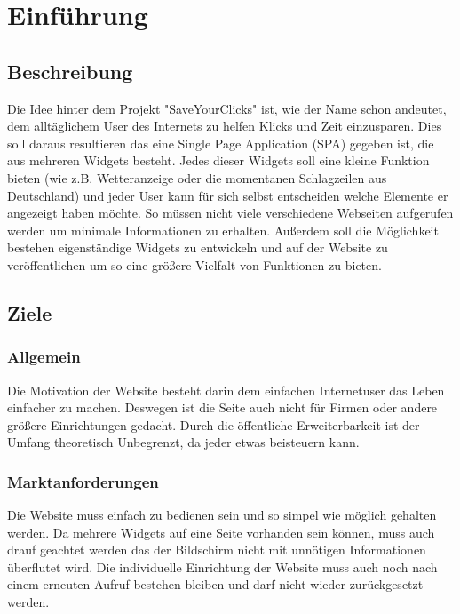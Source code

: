 \newpage

\section{Einführung}

	\subsection{Beschreibung}
		Die Idee hinter dem Projekt "SaveYourClicks" ist, wie der Name schon andeutet, dem alltäglichem User des Internets zu helfen Klicks und Zeit einzusparen. Dies soll daraus resultieren das eine Single Page Application (SPA) gegeben ist, die aus mehreren Widgets besteht. Jedes dieser Widgets soll eine kleine Funktion bieten (wie z.B. Wetteranzeige oder die momentanen Schlagzeilen aus Deutschland) und jeder User kann für sich selbst entscheiden welche Elemente er angezeigt haben möchte. So müssen nicht viele verschiedene Webseiten aufgerufen werden um minimale Informationen zu erhalten. 
		Außerdem soll die Möglichkeit bestehen eigenständige Widgets zu entwickeln und auf der Website zu veröffentlichen um so eine größere Vielfalt von Funktionen zu bieten.
	
	\subsection{Ziele}
	
		\subsubsection{Allgemein}
			Die Motivation der Website besteht darin dem einfachen Internetuser das Leben einfacher zu machen. Deswegen ist die Seite auch nicht für Firmen oder andere größere Einrichtungen gedacht. Durch die öffentliche Erweiterbarkeit ist der Umfang theoretisch Unbegrenzt, da jeder etwas beisteuern kann.
			
		\subsubsection{Marktanforderungen}  
			Die Website muss einfach zu bedienen sein und so simpel wie möglich gehalten werden. Da mehrere Widgets auf eine Seite vorhanden sein können, muss auch drauf geachtet werden das der Bildschirm nicht mit unnötigen Informationen überflutet wird. Die individuelle Einrichtung der Website muss auch noch nach einem erneuten Aufruf bestehen bleiben und darf nicht wieder zurückgesetzt werden.
			
